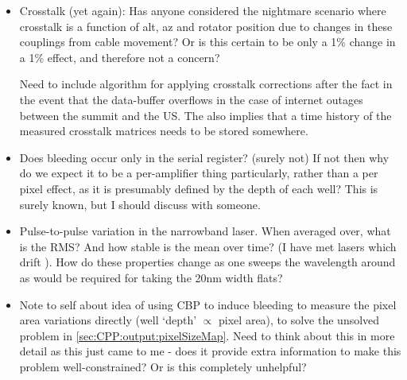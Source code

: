 \begin{itemize}
	\item Crosstalk (yet again): Has anyone considered the nightmare scenario where crosstalk is a function of alt, az and rotator position due to changes in these couplings from cable movement? Or is this certain to be only a 1\% change in a 1\% effect, and therefore not a concern? 
	
	\begin{note}
		Need to include algorithm for applying crosstalk corrections after the fact in the event that the data-buffer overflows in the case of internet outages between the summit and the US. The also implies that a time history of the measured crosstalk matrices needs to be stored somewhere.
	\end{note}
		
	\item Does bleeding occur only in the serial register? (surely not) If not then why do we expect it to be a per-amplifier thing particularly, rather than a per pixel effect, as it is presumably defined by the depth of each well? This is surely known, but I should discuss with someone. 
	
	\item Pulse-to-pulse variation in the narrowband laser. When averaged over, what is the RMS? And how stable is the mean over time? (I have met lasers which drift ). How do these properties change as one sweeps the wavelength around as would be required for taking the 20nm width flats?
	
	\item Note to self about idea of using CBP to induce bleeding to measure the pixel area variations directly (well `depth' $\propto$ pixel area), to solve the unsolved problem in \secsymbol\ref{sec:CPP:output:pixelSizeMap}. Need to think about this in more detail as this just came to me - does it provide extra information to make this problem well-constrained? Or is this completely unhelpful?
\end{itemize}



